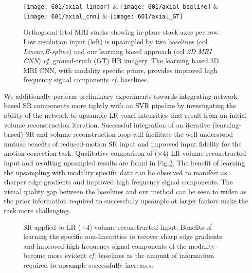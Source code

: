 \documentclass[runningheads,a4paper]{llncs}
\begin{document}
\begin{figure}[H]
{\begin{tabular}
			\vspace{-8pt}\texttt{[image: 601/axial\_linear]}		&
			\vspace{-8pt}\texttt{[image: 601/axial\_bspline]}		&
			\vspace{-8pt}\texttt{[image: 601/axial\_cnn]}			&
			\vspace{-8pt}\texttt{[image: 601/axial\_GT]} 
		\end{tabular}
}
\caption{Orthogonal fetal MRI stacks showing in-plane stack axes per row. Low resolution input (left) is upsampled by two baselines (col \emph{Linear},\emph{B-spline}) and our learning based approach (col \emph{3D MRI CNN}) \emph{cf.} ground-truth (GT) HR imagery. The learning based 3D MRI CNN, with modality specific priors, provides improved high frequency signal components \emph{cf.} baselines.}
\label{fig:input_upsample}
\end{figure}

We additionally perform preliminary experiments towards integrating network-based SR components more tightly with an SVR pipeline by investigating the ability of the network to upsample LR voxel intensities that result from an initial volume reconstruction iteration. Successful integration of an iterative (learning-based) SR and volume reconstruction loop will facilitate the well understood mutual benefits of reduced-motion SR input and improved input fidelity for the motion correction task. Qualitative comparison of ($\times4$) LR volume-reconstructed input and resulting upsampled results are found in Fig.\ref{fig:recon_upsample}. The benefit of learning the upsampling with modality specific data can be observed to manifest as sharper edge gradients and improved high frequency signal components. The visual quality gap between the baselines and our method can be seen to widen as the prior information required to successfully upsample at larger factors make the task more challenging.

\begin{figure}[!htbp]
     \centering
     \hfill
     \caption{SR applied to LR ($\times4$) volume reconstructed input. Benefits of learning the specific non-linearities to recover sharp edge gradients and improved high frequency signal components of the modality become more evident \emph{cf.} baselines as the amount of information required to upsample-successfully increases.}
     \label{fig:recon_upsample}
\end{figure}
\end{document}
